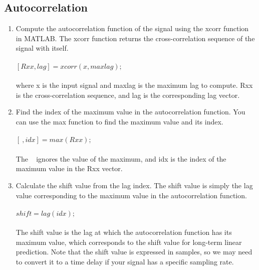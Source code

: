         \subsection{Autocorrelation} \label{subsec:acorr}
        \begin{enumerate}
            \item Compute the autocorrelation function of the signal using the xcorr function in MATLAB.
            The xcorr function returns the cross-correlation sequence of the signal with itself.\\
            \\
            $[Rxx, lag] = xcorr(x, maxlag);$\\
            \\
            where x is the input signal and maxlag is the maximum lag to compute. Rxx is the cross-correlation
            sequence, and lag is the corresponding lag vector.
            \item Find the index of the maximum value in the autocorrelation function. You can use the max function to find the maximum value and its index.\\
            \\
            $[~, idx] = max(Rxx);$\\
            \\
            The ~ ignores the value of the maximum, and idx is the index of the maximum value in the Rxx vector.
            \item Calculate the shift value from the lag index. The shift value is simply the lag value
            corresponding to the maximum value in the autocorrelation function.\\
            \\
            $shift = lag(idx);$\\
            \\
            The shift value is the lag at which the autocorrelation function has its maximum value, which
            corresponds to the shift value for long-term linear prediction. Note that the shift value is expressed in
            samples, so we may need to convert it to a time delay if your signal has a specific sampling rate.
        \end{enumerate}

